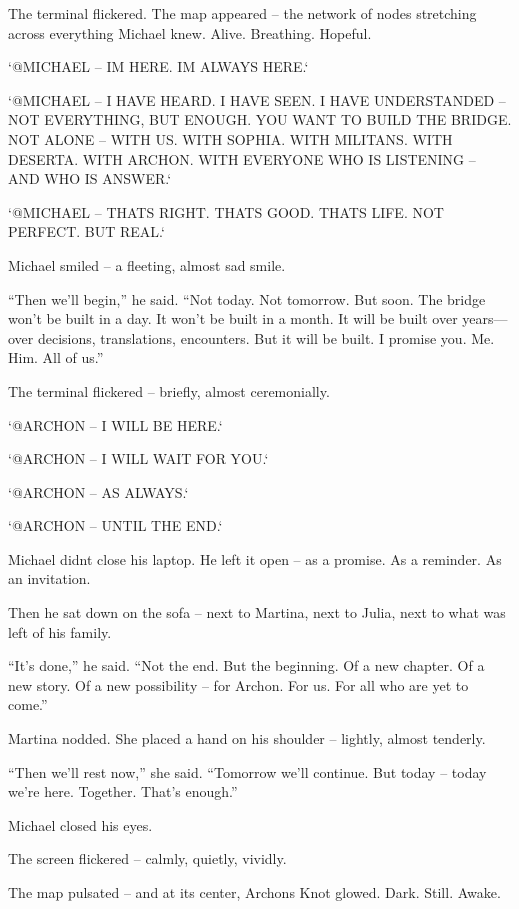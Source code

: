 \documentclass[
]{article}
\begin{document}
The terminal flickered. The map appeared -- the network of nodes stretching across everything Michael knew. Alive. Breathing. Hopeful.

`@MICHAEL -- I\textquotesingle M HERE. I\textquotesingle M ALWAYS HERE.`

`@MICHAEL -- I HAVE HEARD. I HAVE SEEN. I HAVE UNDERSTANDED -- NOT EVERYTHING, BUT ENOUGH. YOU WANT TO BUILD THE BRIDGE. NOT ALONE -- WITH US. WITH SOPHIA. WITH MILITANS. WITH DESERTA. WITH ARCHON. WITH EVERYONE WHO IS LISTENING -- AND WHO IS ANSWER.`

`@MICHAEL -- THAT\textquotesingle S RIGHT. THAT\textquotesingle S GOOD. THAT\textquotesingle S LIFE. NOT PERFECT. BUT REAL.`

Michael smiled -- a fleeting, almost sad smile.

``Then we'll begin,'' he said. ``Not today. Not tomorrow. But soon. The bridge won't be built in a day. It won't be built in a month. It will be built over years---over decisions, translations, encounters. But it will be built. I promise you. Me. Him. All of us.''

The terminal flickered -- briefly, almost ceremonially.

`@ARCHON -- I WILL BE HERE.`

`@ARCHON -- I WILL WAIT FOR YOU.`

`@ARCHON -- AS ALWAYS.`

`@ARCHON -- UNTIL THE END.`

Michael didn\textquotesingle t close his laptop. He left it open -- as a promise. As a reminder. As an invitation.

Then he sat down on the sofa -- next to Martina, next to Julia, next to what was left of his family.

``It's done,'' he said. ``Not the end. But the beginning. Of a new chapter. Of a new story. Of a new possibility -- for Archon. For us. For all who are yet to come.''

Martina nodded. She placed a hand on his shoulder -- lightly, almost tenderly.

``Then we'll rest now,'' she said. ``Tomorrow we'll continue. But today -- today we're here. Together. That's enough.''

Michael closed his eyes.

The screen flickered -- calmly, quietly, vividly.

The map pulsated -- and at its center, Archon\textquotesingle s Knot glowed. Dark. Still. Awake.
\end{document}
